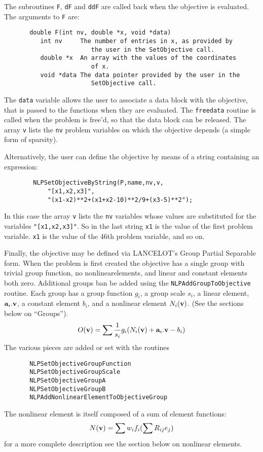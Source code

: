 \documentclass[12pt]{article}
\begin{document}
     The subroutines {\tt F}, {\tt dF} and {\tt ddF} are called back when the objective is evaluated. The
     arguments to {\tt F} are:
     \begin{verbatim}
       double F(int nv, double *x, void *data)
          int nv     The number of entries in x, as provided by
                        the user in the SetObjective call.
          double *x  An array with the values of the coordinates
                        of x.
          void *data The data pointer provided by the user in the
                        SetObjective call.
     \end{verbatim}
     The {\tt data} variable allows the user to associate a data block with the objective, that is passed to the 
     functions when they are evaluated. The {\tt freedata} routine is called when the problem is free'd, so that
     the data block can be released. The array {\tt v} lists the {\tt nv} problem variables on which the objective
     depends (a simple form of sparsity).

     Alternatively, the user can define the objective by means of a string containing an expression:
     \begin{verbatim}
        NLPSetObjectiveByString(P,name,nv,v,
            "[x1,x2,x3]",
            "(x1-x2)**2+(x1+x2-10)**2/9+(x3-5)**2");
     \end{verbatim}
     In this case the array {\tt v} lists the {\tt nv} variables whose values are substituted for the variables 
     {\tt "[x1,x2,x3]"}. So in the last string {\tt x1} is the value of the first problem variable. {\tt x1} is the
     value of the 46th problem variable, and so on.

     Finally, the objective may be defined via LANCELOT's Group Partial Separable form. When the problem is 
     first created the objective has a single group with trivial group function, no nonlinearelements, and
     linear and constant elements both zero. Additional groups ban be added using the
     {\tt NLPAdd\-Group\-To\-Objective} routine. Each group has a group function $g_i$, a group scale $s_i$,
     a linear element, ${\bf a}_i.{\bf v}$, a constant element $b_i$, and a nonlinear element $N_i({\bf v})$.
     (See the sections below on ``Groups''). 
     \begin{displaymath}
       O({\bf v}) = \sum {1\over{s_i}}g_i(N_i({\bf v})+ {\bf a}_i.{\bf v}-b_i)
     \end{displaymath}
     The various pieces are added or set with the routines
     \begin{verbatim}
       NLPSetObjectiveGroupFunction
       NLPSetObjectiveGroupScale
       NLPSetObjectiveGroupA
       NLPSetObjectiveGroupB
       NLPAddNonlinearElementToObjectiveGroup
     \end{verbatim}
     The nonlinear element is itself composed of a sum of element functions:
     \begin{displaymath}
       N({\bf v}) = \sum w_i f_i( \sum R_{ij} e_j )
     \end{displaymath}
     for a more complete description see the section below on nonlinear elements.
\end{document}
